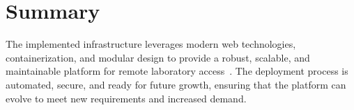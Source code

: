 \section{Summary}

The implemented infrastructure leverages modern web technologies, containerization, and modular design to provide a robust, scalable, and maintainable platform for remote laboratory access~\cite{nextjs-docs,docker-docs}. The deployment process is automated, secure, and ready for future growth, ensuring that the platform can evolve to meet new requirements and increased demand.
